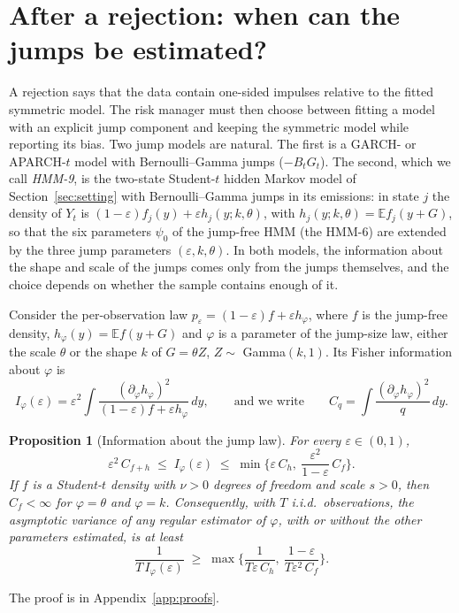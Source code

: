\documentclass[11pt,a4paper]{article}
\newtheorem{proposition}{Proposition}
\theoremstyle{definition}
\theoremstyle{remark}
\newcommand{\E}{\mathbb{E}}
\begin{document}
\section{After a rejection: when can the jumps be estimated?}\label{sec:after}
A rejection says that the data contain one-sided impulses relative to the fitted symmetric model. The risk manager must then choose between fitting a model with an explicit jump component and keeping the symmetric model while reporting its bias. Two jump models are natural. The first is a GARCH- or APARCH-$t$ model with Bernoulli--Gamma jumps ($-B_tG_t$). The second, which we call \emph{HMM-9}, is the two-state Student-$t$ hidden Markov model of Section~\ref{sec:setting} with Bernoulli--Gamma jumps in its emissions: in state $j$ the density of $Y_t$ is $(1-\varepsilon)f_j(y)+\varepsilon h_j(y;k,\theta)$, with $h_j(y;k,\theta)=\E f_j(y+G)$, so that the six parameters $\psi_0$ of the jump-free HMM (the HMM-6) are extended by the three jump parameters $(\varepsilon,k,\theta)$. In both models, the information about the shape and scale of the jumps comes only from the jumps themselves, and the choice depends on whether the sample contains enough of it.

Consider the per-observation law $p_\varepsilon=(1-\varepsilon)f+\varepsilon h_\varphi$, where $f$ is the jump-free density, $h_\varphi(y)=\E f(y+G)$ and $\varphi$ is a parameter of the jump-size law, either the scale $\theta$ or the shape $k$ of $G=\theta Z$, $Z\sim$ Gamma$(k,1)$. Its Fisher information about $\varphi$ is
\begin{equation}\label{eq:Iphi}
I_\varphi(\varepsilon)=\varepsilon^2\int\frac{(\partial_\varphi h_\varphi)^2}{(1-\varepsilon)f+\varepsilon h_\varphi}\,dy,
\qquad\text{and we write}\qquad C_q=\int\frac{(\partial_\varphi h_\varphi)^2}{q}\,dy .
\end{equation}

\begin{proposition}[Information about the jump law]\label{prop:jumpinfo}
For every $\varepsilon\in(0,1)$,
\[
\varepsilon^2\,C_{f+h}\;\le\;I_\varphi(\varepsilon)\;\le\;\min\Big\{\varepsilon\,C_h,\ \frac{\varepsilon^2}{1-\varepsilon}\,C_f\Big\}.
\]
If $f$ is a Student-$t$ density with $\nu>0$ degrees of freedom and scale $s>0$, then $C_f<\infty$ for $\varphi=\theta$ and $\varphi=k$. Consequently, with $T$ i.i.d.\ observations, the asymptotic variance of any regular estimator of $\varphi$, with or without the other parameters estimated, is at least
\[
\frac{1}{T\,I_\varphi(\varepsilon)}\;\ge\;\max\Big\{\frac{1}{T\varepsilon\,C_h},\ \frac{1-\varepsilon}{T\varepsilon^2\,C_f}\Big\}.
\]
\end{proposition}
\noindent The proof is in Appendix~\ref{app:proofs}.
\end{document}
